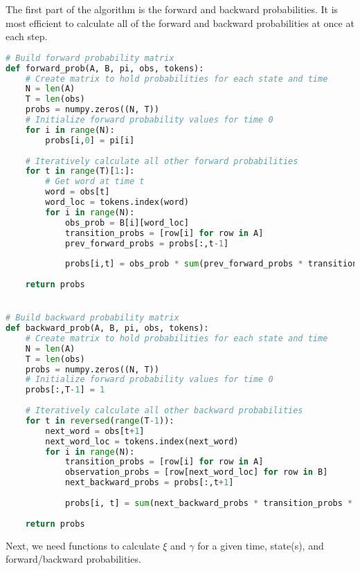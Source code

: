 \documentclass[14pt]{article}
\begin{document}
The first part of the algorithm is the forward and backward probabilities.  It is most efficient to calculate all of the forward and backward probabilities at once at each step.

\begin{lstlisting}[language=Python]
# Build forward probability matrix
def forward_prob(A, B, pi, obs, tokens):
    # Create matrix to hold probabilities for each state and time
    N = len(A)
    T = len(obs)
    probs = numpy.zeros((N, T))
    # Initialize forward probability values for time 0
    for i in range(N):
        probs[i,0] = pi[i]
    
    # Iteratively calculate all other forward probabilities
    for t in range(T)[1:]:
        # Get word at time t
        word = obs[t] 
        word_loc = tokens.index(word)
        for i in range(N):
            obs_prob = B[i][word_loc]
            transition_probs = [row[i] for row in A]
            prev_forward_probs = probs[:,t-1]
            
            probs[i,t] = obs_prob * sum(prev_forward_probs * transition_probs)
            
    return probs


# Build backward probability matrix
def backward_prob(A, B, pi, obs, tokens):
    # Create matrix to hold probabilities for each state and time
    N = len(A)
    T = len(obs)
    probs = numpy.zeros((N, T))
    # Initialize forward probability values for time 0
    probs[:,T-1] = 1
    
    # Iteratively calculate all other backward probabilities
    for t in reversed(range(T-1)):
        next_word = obs[t+1]
        next_word_loc = tokens.index(next_word)
        for i in range(N):
            transition_probs = [row[i] for row in A]
            observation_probs = [row[next_word_loc] for row in B]
            next_backward_probs = probs[:,t+1]
            
            probs[i, t] = sum(next_backward_probs * transition_probs * observation_probs)
    
    return probs
\end{lstlisting}

Next, we need functions to calculate $\xi$ and $\gamma$ for a given time, state(s), and forward/backward probabilities.
\end{document}
